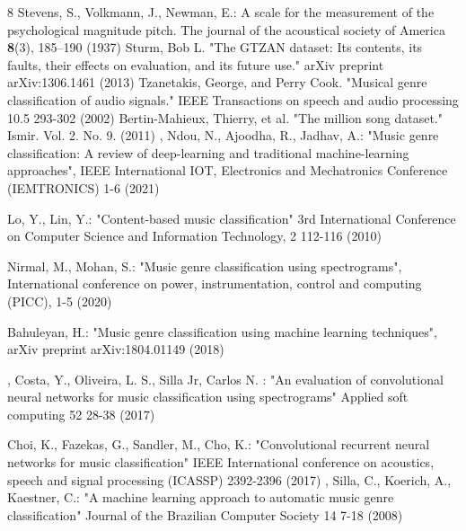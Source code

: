 \documentclass[runningheads]{llncs}
\begin{document}
%
%
%

% 

\begin{thebibliography}{8}
Stevens, S., Volkmann, J., Newman, E.: A scale for the measurement of the psychological magnitude pitch. The journal of the acoustical society of America \textbf{8}(3), 185--190 (1937)
Sturm, Bob L. "The GTZAN dataset: Its contents, its faults, their effects on evaluation, and its future use." arXiv preprint arXiv:1306.1461 (2013)
Tzanetakis, George, and Perry Cook. "Musical genre classification of audio signals." IEEE Transactions on speech and audio processing 10.5 293-302 (2002)
Bertin-Mahieux, Thierry, et al. "The million song dataset." Ismir. Vol. 2. No. 9. (2011)
,
Ndou, N., Ajoodha, R., Jadhav, A.: "Music genre classification: A review of deep-learning and traditional machine-learning approaches", IEEE International IOT, Electronics and Mechatronics Conference (IEMTRONICS) 1-6 (2021)

Lo, Y., Lin, Y.: "Content-based music classification" 3rd International Conference on Computer Science and Information Technology, 2 112-116 (2010)

Nirmal, M., Mohan, S.: "Music genre classification using spectrograms", International conference on power, instrumentation, control and computing (PICC), 1-5 (2020)

Bahuleyan, H.: "Music genre classification using machine learning techniques", arXiv preprint arXiv:1804.01149 (2018)

,
Costa, Y.,  Oliveira, L. S., Silla Jr, Carlos N. : "An evaluation of convolutional neural networks for music classification using spectrograms" Applied soft computing 52 28-38 (2017)

Choi, K., Fazekas, G., Sandler, M., Cho, K.: "Convolutional recurrent neural networks for music classification" IEEE International conference on acoustics, speech and signal processing (ICASSP) 2392-2396 (2017)
,
Silla, C., Koerich, A., Kaestner, C.: "A machine learning approach to automatic music genre classification" Journal of the Brazilian Computer Society 14 7-18 (2008)


\end{thebibliography}
\end{document}
